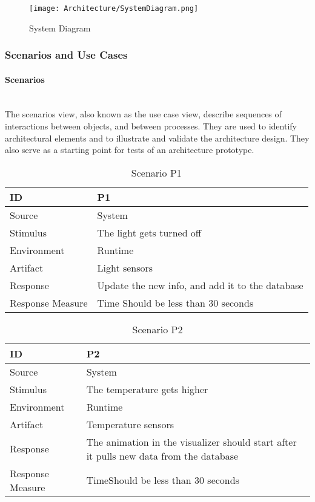 \documentclass[../document.tex]{subfiles}
\begin{document}
\begin{figure}[H]
	\centering
	\texttt{[image: Architecture/SystemDiagram.png]}
	\caption{System Diagram}
\end{figure}

\subsubsection{Scenarios and Use Cases}
\paragraph{Scenarios} \ \\
The scenarios view, also known as the use case view, describe sequences of interactions between objects, and between processes. They are used to identify architectural elements and to illustrate and validate the architecture design. They also serve as a starting point for tests of an architecture prototype.

\begin{table}[H]
	\caption{Scenario P1}
	\begin{tabularx}{\textwidth}{|X|X|}
		\hline
		ID					& P1 \\ \hline
		Source				& System \\ \hline
		Stimulus			& The light gets turned off \\ \hline
		Environment			& Runtime \\ \hline
		Artifact			& Light sensors \\ \hline
		Response			& Update the new info, and add it to the database \\ \hline
		Response Measure	& Time \newline Should be less than 30 seconds
		\\ \hline
	\end{tabularx}
\end{table}

\begin{table}[H]
	\caption{Scenario P2}
	\begin{tabularx}{\textwidth}{|X|X|}
		\hline
		ID					& P2 \\ \hline
		Source				& System \\ \hline
		Stimulus			& The temperature gets higher \\ \hline
		Environment			& Runtime \\ \hline
		Artifact			& Temperature sensors \\ \hline
		Response			& The animation in the visualizer should start after it pulls new data from the database \\ \hline
		Response Measure	& Time\newline Should be less than 30 seconds
		\\ \hline
	\end{tabularx}
\end{table}
\end{document}
